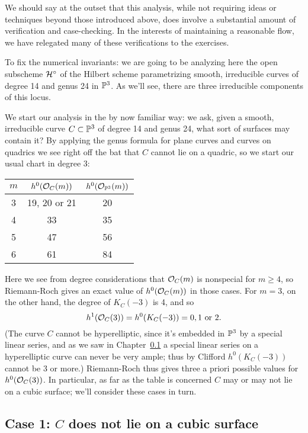 We should say at the outset that this analysis, while not requiring ideas or techniques beyond those introduced above, does involve a substantial amount of verification and case-checking. In the interests of maintaining a reasonable flow, we have relegated many of these verifications to the exercises.

To fix the numerical invariants: we are going to be analyzing here the open subscheme $\cH^\circ$ of the Hilbert scheme parametrizing smooth, irreducible curves of degree 14 and genus 24 in $\PP^3$. As we'll see, there are three irreducible components of this locus. 

We start our analysis in the by now familiar way: we ask, given a smooth, irreducible curve $C \subset \PP^3$ of degree 14 and genus 24, what sort of surfaces may contain it? By applying the genus formula for plane curves and curves on quadrics we see right off the bat that $C$ cannot lie on a quadric, so we start our usual chart in degree 3:

\begin{center}\label{postulation table}
\begin{tabular}{ c | c | c }
 $m$ & $h^0(\cO_C(m))$ & $h^0(\cO_{\PP^3}(m))$ \\
 \hline
 3 & 19, 20 or 21 & 20 \\
 4 & 33 & 35 \\
 5 & 47 & 56 \\
 6 & 61 & 84
\end{tabular}
\end{center}

Here we see from degree considerations that $\cO_C(m)$ is nonspecial for $m \geq 4$, so Riemann-Roch gives an exact value of $h^0(\cO_C(m))$ in those cases. For $m=3$, on the other hand, the degree of $K_C(-3)$ is 4, and so 
$$
h^1(\cO_C(3)) = h^0(K_C(-3)) = 0, 1 \text{ or } 2.
$$
(The curve $C$ cannot be hyperelliptic, since it's embedded in $\PP^3$ by a special linear series, and as we saw in Chapter~\ref{} a special linear series on a hyperelliptic curve can never be very ample; thus by Clifford $h^0(K_C(-3))$ cannot be 3 or more.) Riemann-Roch thus gives three a priori possible values for $h^0(\cO_C(3))$. In particular, as far as the table is concerned $C$ may or may not lie on a cubic surface; we'll consider these cases in turn.

\subsection{Case 1: $C$ does not lie on a cubic surface}

